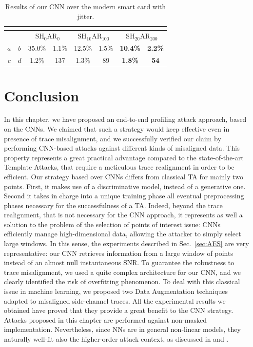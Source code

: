     

\begin{table}
\centering
\begin{tabular}{|c|c|c|c|c|c|c|c|}
\multicolumn{8}{c}{}\\
\hline
\multicolumn{2}{|c|}{} & \multicolumn{2}{c|}{$\mathrm{SH}_{0}\mathrm{AR}_{0}$} & \multicolumn{2}{c|}{$\mathrm{SH}_{10}\mathrm{AR}_{100}$} & \multicolumn{2}{c|}{$\mathrm{SH}_{20}\mathrm{AR}_{200}$} \\ \hline
$a$        & $b$       & 35.0\%                     & 1.1\%                    & 12.5\%                      & 1.5\%                      & \textbf{10.4\%}             & \textbf{2.2\%}             \\ \hline
$c$        & $d$       & 1.2\%                      & 137                      & 1.3\%                       & 89                         & \textbf{1.8\%}              & \textbf{54}                \\ \hline
\end{tabular}

\caption{Results of our CNN over the modern smart card with jitter.}\label{tab:res_AES}
\end{table}

  
\section{Conclusion}
In this chapter, we have proposed an end-to-end profiling attack approach, based on the CNNs. We claimed that such a strategy would keep effective even in presence of trace misalignment, and we successfully verified our claim by performing CNN-based attacks against different kinds of misaligned data. This property represents a great practical advantage compared to the state-of-the-art Template Attacks, that require a meticulous trace realignment in order to be efficient. Our strategy based over CNNs differs from classical TA for mainly two points. First, it makes use of a discriminative model, instead of a generative one. Second it takes in charge into a unique training phase all eventual preprocessing phases necessary for the successfulness of a TA. Indeed, beyond the trace realignment, that is not necessary for the CNN approach, it represents as well a solution to the problem of the selection of points of interest issue: CNNs efficiently manage high-dimensional data, allowing the attacker to simply  select large windows. In this sense, the experiments described in Sec.~\ref{sec:AES} are very representative: our CNN retrieves information from a large window of points instead of an almost null instantaneous SNR. To guarantee the robustness to trace misalignment, we used a quite complex architecture for our CNN, and we clearly identified the risk of overfitting phenomenon. To deal with this classical issue in machine learning, we proposed two Data Augmentation techniques adapted to misaligned side-channel traces. All the experimental results we obtained have proved that they provide a great benefit to the CNN strategy.  Attacks proposed in this chapter are performed against non-masked implementation. Nevertheless, since NNs are in general non-linear models, they naturally well-fit also the higher-order attack context, as discussed in \cite{maghrebi2016breaking} and \cite{DLwhitepaper}.